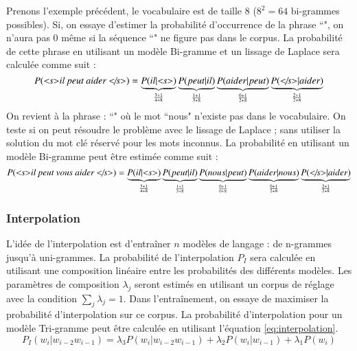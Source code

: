 \documentclass{KodeBook}
\begin{document}
Prenons l'exemple précédent, le vocabulaire est de taille $8$ ($8^2 = 64$ bi-grammes possibles).
Si, on essaye d'estimer la probabilité d'occurrence de la phrase ``", on n'aura pas $0$ même si la séquence ``" ne figure pas dans le corpus.
La probabilité de cette phrase en utilisant un modèle Bi-gramme et un lissage de Laplace sera calculée comme suit : 
\[
P(\text{\textit{\textless s\textgreater il peut aider \textless/s\textgreater}}) = 
\underbrace{P(il|\text{\textit{\textless s\textgreater}})}_{\frac{3+1}{4+8}}
\underbrace{P(peut|il)}_{\frac{1+1}{3+8}} 
\underbrace{P(aider|peut)}_{\frac{0+1}{2+8}}
\underbrace{P(\text{\textit{\textless/s\textgreater}}|aider)}_{\frac{2+1}{2+8}}
\]
%
On revient à la phrase : 
``" où le mot ``nous" n'existe pas dans le vocabulaire. 
On teste si on peut résoudre le problème avec le lissage de Laplace ; sans utiliser la solution du mot clé réservé pour les mots inconnus.
La probabilité en utilisant un modèle Bi-gramme peut être estimée comme suit : 
\[
P(\text{\textit{\textless s\textgreater il peut vous aider \textless/s\textgreater}}) = 
\underbrace{P(il|\text{\textit{\textless s\textgreater}})}_{\frac{3+1}{4+8}}
\underbrace{P(peut|il)}_{\frac{1+1}{3+8}} 
\underbrace{P(nous|peut)}_{\frac{0+1}{0+8}} 
\underbrace{P(aider|nous)}_{\frac{0+1}{2+8}}
\underbrace{P(\text{\textit{\textless/s\textgreater}}|aider)}_{\frac{2+1}{2+8}}
\]

\subsubsection{Interpolation}

L'idée de l'interpolation est d'entraîner $n$ modèles de langage : de n-grammes jusqu'à uni-grammes. 
La probabilité de l'interpolation $P_I$ sera calculée en utilisant une composition linéaire entre les probabilités des différents modèles. 
Les paramètres de composition $\lambda_j$ seront estimés en utilisant un corpus de réglage avec la condition $\sum_j \lambda_j = 1$.
Dans l'entraînement, on essaye de maximiser la probabilité d'interpolation sur ce corpus.
La probabilité d'interpolation pour un modèle Tri-gramme peut être calculée en utilisant l'équation \ref{eq:interpolation}. 
\begin{equation}
	P_{I}(w_i | w_{i-2} w_{i-1}) = 
	\lambda_3 P(w_i | w_{i-2} w_{i-1}) 
	+ \lambda_2 P(w_i | w_{i-1}) 
	+ \lambda_1 P(w_i) 
	\label{eq:interpolation}
\end{equation}
\end{document}
